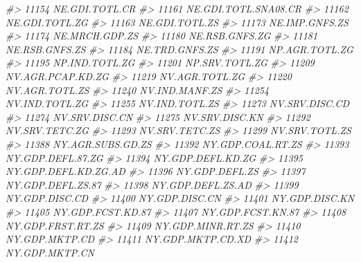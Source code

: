\documentclass[
]{bxjsbook}
\newenvironment{Shaded}{\begin{snugshade}}{\end{snugshade}}
\newcommand{\CommentTok}[1]{\textcolor[rgb]{0.56,0.35,0.01}{\textit{#1}}}
\theoremstyle{definition}
\theoremstyle{definition}
\theoremstyle{definition}
\theoremstyle{definition}
\theoremstyle{remark}
\begin{document}
\begin{Shaded}
\begin{Highlighting}[]
\CommentTok{\#\textgreater{} 11154             NE.GDI.TOTL.CR}
\CommentTok{\#\textgreater{} 11161       NE.GDI.TOTL.SNA08.CR}
\CommentTok{\#\textgreater{} 11162             NE.GDI.TOTL.ZG}
\CommentTok{\#\textgreater{} 11163             NE.GDI.TOTL.ZS}
\CommentTok{\#\textgreater{} 11173             NE.IMP.GNFS.ZS}
\CommentTok{\#\textgreater{} 11174             NE.MRCH.GDP.ZS}
\CommentTok{\#\textgreater{} 11180             NE.RSB.GNFS.ZG}
\CommentTok{\#\textgreater{} 11181             NE.RSB.GNFS.ZS}
\CommentTok{\#\textgreater{} 11184             NE.TRD.GNFS.ZS}
\CommentTok{\#\textgreater{} 11191             NP.AGR.TOTL.ZG}
\CommentTok{\#\textgreater{} 11195             NP.IND.TOTL.ZG}
\CommentTok{\#\textgreater{} 11201             NP.SRV.TOTL.ZG}
\CommentTok{\#\textgreater{} 11209          NV.AGR.PCAP.KD.ZG}
\CommentTok{\#\textgreater{} 11219             NV.AGR.TOTL.ZG}
\CommentTok{\#\textgreater{} 11220             NV.AGR.TOTL.ZS}
\CommentTok{\#\textgreater{} 11240             NV.IND.MANF.ZS}
\CommentTok{\#\textgreater{} 11254             NV.IND.TOTL.ZG}
\CommentTok{\#\textgreater{} 11255             NV.IND.TOTL.ZS}
\CommentTok{\#\textgreater{} 11273             NV.SRV.DISC.CD}
\CommentTok{\#\textgreater{} 11274             NV.SRV.DISC.CN}
\CommentTok{\#\textgreater{} 11275             NV.SRV.DISC.KN}
\CommentTok{\#\textgreater{} 11292             NV.SRV.TETC.ZG}
\CommentTok{\#\textgreater{} 11293             NV.SRV.TETC.ZS}
\CommentTok{\#\textgreater{} 11299             NV.SRV.TOTL.ZS}
\CommentTok{\#\textgreater{} 11388          NY.AGR.SUBS.GD.ZS}
\CommentTok{\#\textgreater{} 11392          NY.GDP.COAL.RT.ZS}
\CommentTok{\#\textgreater{} 11393          NY.GDP.DEFL.87.ZG}
\CommentTok{\#\textgreater{} 11394          NY.GDP.DEFL.KD.ZG}
\CommentTok{\#\textgreater{} 11395       NY.GDP.DEFL.KD.ZG.AD}
\CommentTok{\#\textgreater{} 11396             NY.GDP.DEFL.ZS}
\CommentTok{\#\textgreater{} 11397          NY.GDP.DEFL.ZS.87}
\CommentTok{\#\textgreater{} 11398          NY.GDP.DEFL.ZS.AD}
\CommentTok{\#\textgreater{} 11399             NY.GDP.DISC.CD}
\CommentTok{\#\textgreater{} 11400             NY.GDP.DISC.CN}
\CommentTok{\#\textgreater{} 11401             NY.GDP.DISC.KN}
\CommentTok{\#\textgreater{} 11405          NY.GDP.FCST.KD.87}
\CommentTok{\#\textgreater{} 11407          NY.GDP.FCST.KN.87}
\CommentTok{\#\textgreater{} 11408          NY.GDP.FRST.RT.ZS}
\CommentTok{\#\textgreater{} 11409          NY.GDP.MINR.RT.ZS}
\CommentTok{\#\textgreater{} 11410             NY.GDP.MKTP.CD}
\CommentTok{\#\textgreater{} 11411          NY.GDP.MKTP.CD.XD}
\CommentTok{\#\textgreater{} 11412             NY.GDP.MKTP.CN}

\end{Highlighting}
\end{Shaded}
\end{document}
